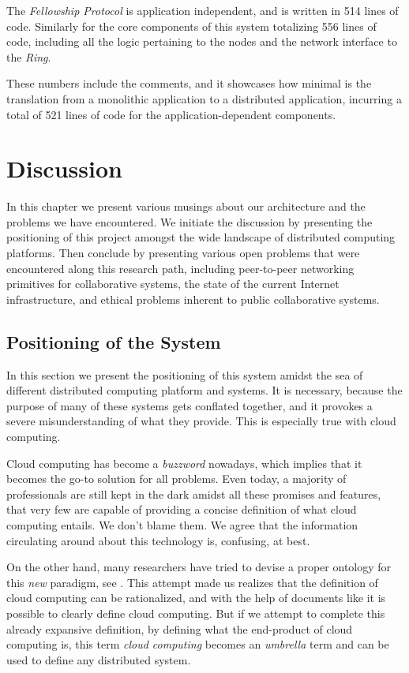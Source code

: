 \documentclass[12pt, titlepage]{uo_temp}
\begin{document}
     The \emph{Fellowship Protocol} is application independent, and is written in 514
     lines of code. Similarly for the core components of this system totalizing 556 lines
     of code, including all the logic pertaining to the nodes and the network interface to
     the \emph{Ring}.
     
     These numbers include the comments, and it showcases how minimal is the translation
     from a monolithic application to a distributed application, incurring a total of 521
     lines of code for the application-dependent components.

     \chapter{Discussion}
     In this chapter we present various musings about our architecture and the problems we
     have encountered. We initiate the discussion by presenting the positioning of this
     project amongst the wide landscape of distributed computing platforms. Then conclude
     by presenting various open problems that were encountered along this research path,
     including peer-to-peer networking primitives for collaborative systems, the state of
     the current Internet infrastructure, and ethical problems inherent to public
     collaborative systems.

     \section{Positioning of the System}
     In this section we present the positioning of this system amidst the sea of different
     distributed computing platform and systems. It is necessary, because the
     purpose of many of these systems gets conflated together, and it provokes a severe
     misunderstanding of what they provide. This is especially true with cloud computing.

     Cloud computing has become a \emph{buzzword} nowadays, which implies that it becomes
     the go-to solution for all problems. Even today, a majority of professionals are
     still kept in the dark amidst all these promises and features, that very few are
     capable of providing a concise definition of what cloud computing entails. We don't
     blame them. We agree that the information circulating around about this technology is,
     confusing, at best. 
     
     On the other hand, many researchers have tried to devise a proper ontology for this
     \emph{new} paradigm, see \cite{ontology}. This attempt made us realizes that the
     definition of cloud computing can be rationalized, and with the help of documents
     like \cite{nist} it is possible to clearly define cloud computing. But if we attempt
     to complete this already expansive definition, by defining what the end-product of
     cloud computing is, this term \emph{cloud computing} becomes an \emph{umbrella} term
     and can be used to define any distributed system.
\end{document}
